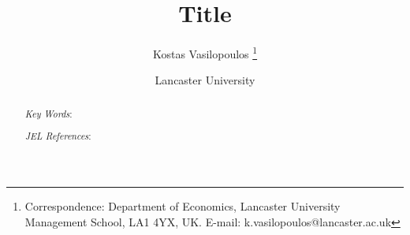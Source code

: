 \documentclass[a4paper,12pt]{article}
\begin{document}
\begin{titlepage}

\title{\Large \textbf{Title}}
\author{Kostas Vasilopoulos \thanks{Correspondence: Department of Economics, Lancaster University Management
School, LA1 4YX, UK. E-mail: k.vasilopoulos@lancaster.ac.uk} }
\date{Lancaster University}
\maketitle


\begin{abstract}
\vspace{2mm}

\noindent 


\bigskip
\par
\noindent \textit{Key Words}:
\par
\noindent \textit{JEL References}:


\end{abstract} 

\end{titlepage}
\end{document}
